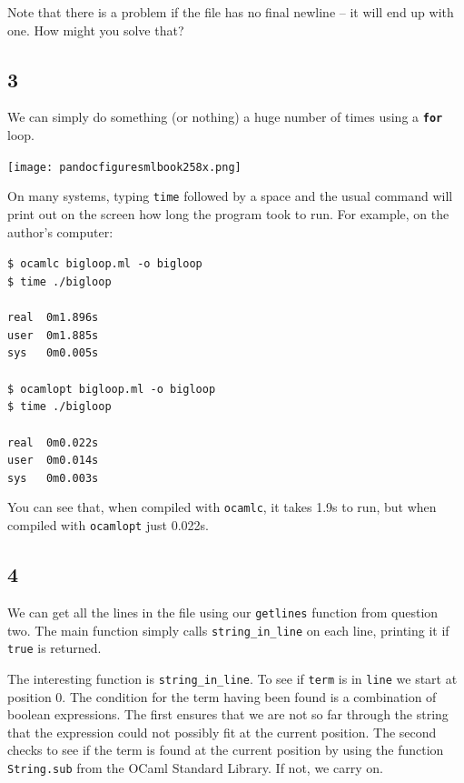 \documentclass[]{book}
\newcommand{\smspace}{\vspace{4mm}}
\begin{document}
Note that there is a problem if the file has no final newline -- it will end
up with one. How might you solve that?

\subsection*{3}
We can simply do something (or nothing) a huge number of times using a \textbf{\texttt{for}} loop. 

\medskip
\begin{center}
\noindent\texttt{[image: pandocfiguresmlbook258x.png]}
\end{center}
\medskip

\noindent On many systems, typing \texttt{time} followed by a space and the usual command will print out on the screen how long the program took to run. For example, on the author's computer:

\smspace
\noindent\texttt{\$ ocamlc bigloop.ml -o bigloop}\\
\texttt{\$ time ./bigloop}\\
\\
\texttt{real\ \ 0m1.896s}\\
\texttt{user\ \ 0m1.885s}\\
\texttt{sys\ \ \ 0m0.005s}\\
\\
\texttt{\$ ocamlopt bigloop.ml -o bigloop}\\
\texttt{\$ time ./bigloop}\\
\\
\texttt{real\ \ 0m0.022s}\\
\texttt{user\ \ 0m0.014s}\\
\texttt{sys\ \ \ 0m0.003s}\vphantom{g}
\smspace

\noindent You can see that, when compiled with \texttt{ocamlc}, it takes 1.9s to run, but when compiled with \texttt{ocamlopt} just 0.022s.

\subsection*{4}
We can get all the lines in the file using our \texttt{getlines} function from question two. The main function simply calls \texttt{string\_in\_line} on each line, printing it if \texttt{true} is returned.

The interesting function is \texttt{string\_in\_line}. To see if \texttt{term} is in \texttt{line} we start at position 0. The condition for the term having been found is a combination of boolean expressions. The first ensures that we are not so far through the string that the expression could not possibly fit at the current position. The second checks to see if the term is found at the current position by using the function \texttt{String.sub} from the OCaml Standard Library. If not, we carry on.
\end{document}

